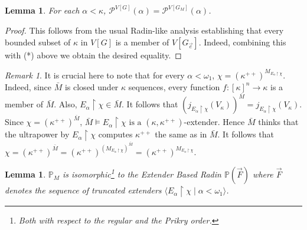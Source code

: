 \documentclass[11pt]{amsart}
\newtheorem{lemma}[theorem]{Lemma}
\theoremstyle{definition}
\theoremstyle{remark}
\newtheorem{remark}[theorem]{Remark}
\newcommand\tom[1]{\marginpar{Tom: #1}}
\newcommand\ale[1]{\marginpar{Alejandro: #1}}
\begin{document}
\begin{lemma}
    For each $\alpha < \kappa$, $\mathcal{P}^{V[G]}(\alpha)=\mathcal{P}^{V[G_M]}(\alpha)$.
\end{lemma}
\begin{proof}
    This follows from the usual Radin-like analysis establishing that every bounded subset of $\kappa$ in $V[G]$ is a member of $V[G_{\vec e}]$. Indeed, combining this with (*) above we obtain the desired equality.
\end{proof}
\begin{remark}
    It is crucial here to note that for every $\alpha<\omega_1$, $\chi=(\kappa^{++})^{M_{E_\alpha\restriction\chi}}$. 
    Indeed, since $\bar{M}$ is closed under $\kappa$ sequences, every function  $f:[\kappa]^n\to\kappa$ is a member of $\bar{M}$. Also, $E_\alpha\restriction\chi\in \bar{M}$. It follows that $(j_{E_\alpha\restriction\chi}(V_{\kappa}))^{\bar{M}}=j_{E_\alpha\restriction\chi}(V_{\kappa})$. Since $\chi=(\kappa^{++})^{\bar{M}}$, $\bar{M}\models E_\alpha\restriction\chi\text{ is a }(\kappa,\kappa^{++})$-extender.
    Hence $\bar{M}$ thinks that the ultrapower by $E_\alpha\restriction\chi$ computes $\kappa^{++}$ the same as in $\bar{M}$. It follows that $\chi=(\kappa^{++})^{\bar{M}}=(\kappa^{++})^{(M_{E_\alpha\restriction\chi})^{\bar{M}}}=(\kappa^{++})^{M_{E_\alpha\restriction\chi}}$.  
\end{remark}
\begin{lemma}
    $\mathbb{P}_M$ is isomorphic\footnote{Both with respect to the regular and the Prikry order.} to the Extender Based Radin $\mathbb{P}(\vec{F})$ where $\vec{F}$ denotes the sequence of truncated extenders $\langle E_\alpha\restriction \chi\mid \alpha<\omega_1\rangle$. %
\end{lemma}
\end{document}
